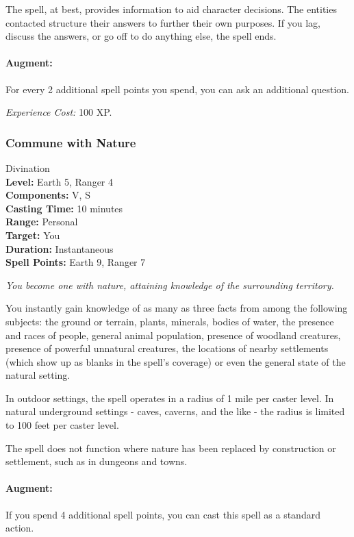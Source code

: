 The spell, at best, provides information to aid character decisions. 
The entities contacted structure their answers to further their own purposes. 
If you lag, discuss the answers, or go off to do anything else, the spell ends.

\paragraph{Augment:} For every 2 additional spell points you spend, 
you can ask an additional question.

\emph{Experience Cost:} 100 XP.

\subsubsection{Commune with Nature}
\label{Spell:CommuneWithNature}
Divination
\\ \textbf{Level:} Earth 5, Ranger 4
\\ \textbf{Components:} V, S
\\ \textbf{Casting Time:} 10 minutes
\\ \textbf{Range:} Personal
\\ \textbf{Target:} You
\\ \textbf{Duration:} Instantaneous
\\ \textbf{Spell Points:} Earth 9, Ranger 7

\emph{You become one with nature, attaining knowledge of the surrounding territory.} 

You instantly gain knowledge of as many as three facts from among the following subjects: the ground or terrain, plants, minerals, bodies of water, the presence and races of people, general animal population, presence of woodland creatures, presence of powerful unnatural creatures, the locations of nearby settlements (which show up as blanks in the spell's coverage) or even the general state of the natural setting.

In outdoor settings, the spell operates in a radius of 1 mile per caster level. 
In natural underground settings - caves, caverns, and the like - the radius is limited to 100 feet per caster level.

The spell does not function where nature has been replaced by construction or settlement, such as in dungeons and towns.

\paragraph{Augment:} If you spend 4 additional spell points, you can cast this spell as a standard action.
